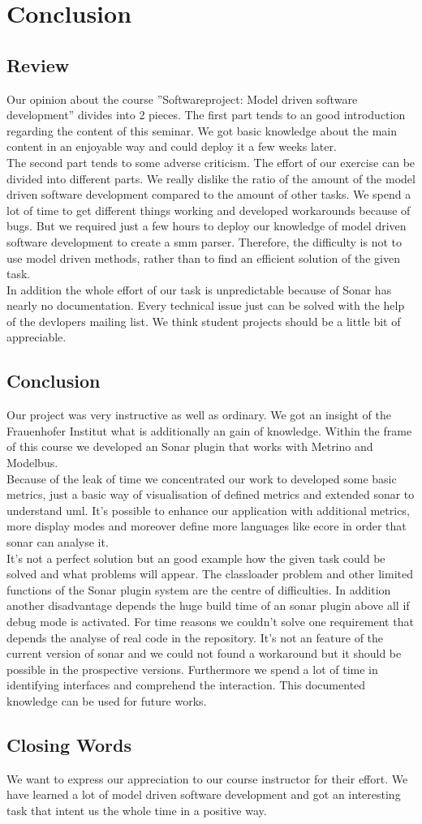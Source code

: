 \chapter{Conclusion}
\section{Review}
Our opinion about the course ''Softwareproject: Model driven software development'' divides into 2 pieces. The first part tends to an good introduction regarding the content of this seminar. We got basic knowledge about the main content in an enjoyable way and could deploy it a few weeks later. \\
The second part tends to some adverse criticism. The effort of our exercise can be divided into different parts. We really dislike the ratio of the amount of the model driven software development compared to the amount of other tasks. We spend a lot of time to get different things working and developed workarounds because of bugs.  But we required just a few hours to deploy our knowledge of model driven software development to create a smm parser. Therefore, the difficulty is not to use model driven methods, rather than to find an efficient solution of the given task. \\
In addition the whole effort of our task is unpredictable because of Sonar has nearly no documentation. Every technical issue just can be solved with the help of the devlopers mailing list. We think student projects should be a little bit of appreciable.

\section{Conclusion}
Our project was very instructive as well as ordinary. We got an insight of the Frauenhofer Institut what is additionally an gain of knowledge. Within the frame of this course we developed an Sonar plugin that works with Metrino and Modelbus. \\
Because of the leak of time we concentrated our work to developed some basic metrics, just a basic way of visualisation of defined metrics and extended sonar to understand uml. It's possible to enhance our application with additional metrics, more display modes and moreover define more languages like ecore in order that sonar can analyse it. \\ 
It's not a perfect solution but an good example how the given task could be solved and what problems will appear. The classloader problem and other limited functions of the Sonar plugin system are the centre of difficulties. In addition another disadvantage depends the huge build time of an sonar plugin above all if debug mode is activated. For time reasons we couldn't solve one requirement that depends the analyse of real code in the repository. It's not an feature of the current version of sonar and we could not found a workaround but it should be possible in the prospective versions. Furthermore we spend a lot of time in identifying interfaces and comprehend the interaction. This documented knowledge can be used for future works.
\section{Closing Words}
We want to express our appreciation to our course instructor for their effort. We have learned a lot of model driven software development and got an interesting task that intent us the whole time in a positive way. 